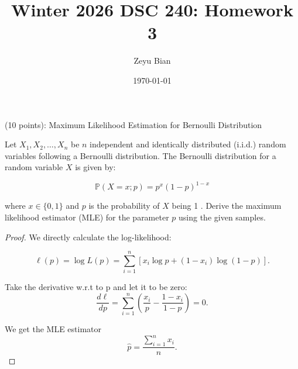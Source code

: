 \documentclass[en,hazy,blue,12pt,normal]{elegantnote}
\title{Winter 2026 DSC 240: Homework 3}
\author{Zeyu Bian}
\date{\today}
\begin{document}
\maketitle
\begin{homework}
    (10 points): Maximum Likelihood Estimation for Bernoulli Distribution

Let $X_1, X_2, \ldots, X_n$ be $n$ independent and identically distributed (i.i.d.) random variables following a Bernoulli distribution. The Bernoulli distribution for a random variable $X$ is given by:

$$
\mathbb{P}(X=x ; p)=p^x(1-p)^{1-x}
$$

where $x \in\{0,1\}$ and $p$ is the probability of $X$ being 1 . Derive the maximum likelihood estimator (MLE) for the parameter $p$ using the given samples.
\end{homework}

\begin{proof}
    We directly calculate the log-likelihood:

$$
\ell(p)=\log L(p)=\sum_{i=1}^n\left[x_i \log p+\left(1-x_i\right) \log (1-p)\right] .
$$

Take the derivative w.r.t to p and let it to be zero:
\[\frac{d \ell}{d p}=\sum_{i=1}^n\left(\frac{x_i}{p}-\frac{1-x_i}{1-p}\right)=0.\]

We get the MLE estimator
\[\hat{p} = \frac{\sum_{i=1}^nx_i}{n}.\]
\end{proof}
\end{document}
